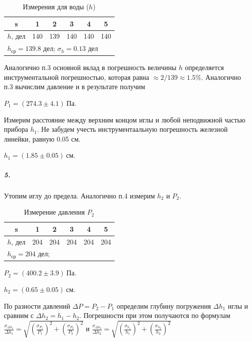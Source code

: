 \documentclass[a4paper,12pt]{article}
\begin{document}
\begin{table}[h!]
	\centering
	\caption{Измерения для воды ($h$)}
	\begin{tabular}{|c|c|c|c|c|c|} \hline
		s& 1& 2 & 3& 4& 5 \\ \hline
		$h$, дел &140 & 139 & 140& 140& 140 \\ \hline
		\multicolumn{6}{|l|}{$h_{ср} = 139.8$ дел; $\sigma_h = 0.13$ дел} \\ \hline
		
	\end{tabular}
\end{table}

Аналогично п.3 основной вклад в погрешность величины $h$ определяется инструментальной погрешностью, которая равна $\approx 2 / 139 \approx  1.5 \% $. Аналогично п.3 вычислим давление и в результате получим 

$
P_1 = (274.3 \pm 4.1) ~ Па.
$


Измерим расстояние между верхним концом иглы и любой неподвижной частью прибора $h_1$. Не забудем учесть инструментаальную погрешность железной линейки, равную 0.05 см.

$
h_1 = (1.85 \pm 0.05) ~ см.
$


\subparagraph*{5.} Утопим иглу до предела. Аналогично п.4 измерим $h_2$ и $P_2$.


\begin{table}[h!]
	\centering
	\caption{Измерение давления $P_2$}
	\begin{tabular}{|c|c|c|c|c|c|} \hline
		s& 1& 2 & 3& 4& 5 \\ \hline
		$h$, дел &204& 204& 204& 204& 204\\ \hline
    	\multicolumn{6}{|l|}{$h_{ср} = 204$ дел;}  \\ \hline
	\end{tabular}
\end{table}




$
P_2 = (400.2 \pm 3.9)~ Па.
$  

$
h_2 = (0.65 \pm 0.05)~ см.
$

По разности давлений $\Delta P= P_2 - P_1$ определим глубину погружения $\Delta h_1$ иглы и сравним с $\Delta h_2 =  h_1- h_2$. Погрешности при этом получаются по формулам $\frac{\sigma_{\Delta h_1} }{\Delta h_1}= \sqrt{\left(\frac{\sigma_{P_1}}{P_1}\right)^2 + \left(\frac{\sigma_{P_2}}{P_2}\right)^2}$ и $\frac{\sigma_{\Delta h_2} }{\Delta h_2}= \sqrt{\left(\frac{\sigma_{h_1}}{h_1}\right)^2 + \left(\frac{\sigma_{h_2}}{h_2}\right)^2}$
\end{document}
